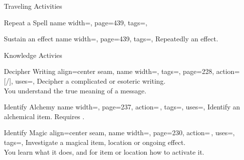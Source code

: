 \begin{PageFront}
\begin{Tables}{\frontTableHeight}
\begin{Table}{Traveling Activities}
\begin{entry}{Repeat a Spell}{%
                name width=\activityLength,%
                page=439,
                tags=\Concentrate,
            }
            \end{entry}
            \begin{entry}{Sustain an effect}{%
                name width=\activityLength,%
                page=439,
                tags=\Concentrate,
            }
                Repeatedly  an effect. \hfill{}
            \end{entry}
        \end{Table}
        \TableSpace
        \begin{Table}{Knowledge Activies}
            \begin{entry}{Decipher Writing}{%
                align=center seam,
                name width=\activityLength,%
                tags=\Concentrate,
                page=228,
                action=\,[/],
                uses={\VariousKnowledge[tags={T,S}]},
            }
                Decipher a complicated or esoteric writing. \hfill{}\\
                You understand the true meaning of a   message. \hfill {}
            \end{entry}
            \begin{entry}{Identify Alchemy}{%
                name width=\activityLength,%
                page=237,
                action=\,,
                tags=\Concentrate,
                uses={\Crafting[tags={T,S}]},
            }
                Identify an alchemical item. Requires .\hfill {}%
            \end{entry}
            \begin{entry}{Identify Magic}{%
                align=center seam,
                name width=\activityLength,%
                page=230,
                action=\,,
                uses={\MagicalSkill[tags={T,S}]},
                tags=\Concentrate,
            }
                Investigate a magical item, location or ongoing effect.\hfill {}\quad {}\\
                You learn what it does, and for item or location how to activate it. \hfill{}\quad\;\, 
            \end{entry}

\end{Table}
\end{Tables}
\end{PageFront}
